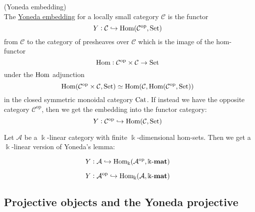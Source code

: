 \begin{definition}{(Yoneda embedding)}\label{def:yoneda_embedding}\\
The \ul{Yoneda embedding} for a locally small category $\mathcal{C}$ is the functor
\[
Y : \mathcal{C} \hookrightarrow \textup{Hom}(\mathcal{C}^{\text{op}}, \textup{Set})
\]
from $\mathcal{C}$ to the category of presheaves over $\mathcal{C}$ which is the image of the hom-functor
\[
\textup{Hom} : \mathcal{C}^{\text{op}}\times\mathcal{C} \rightarrow \textup{Set}
\]
under the $\textup{Hom}$ adjunction
\[
\textup{Hom}(\mathcal{C}^{\text{op}}\times\mathcal{C}, \textup{Set}) \simeq
\textup{Hom}(\mathcal{C},\textup{Hom}(\mathcal{C}^{\text{op}}, \textup{Set}))
\]
in the closed symmetric monoidal category $\textup{Cat}$.
If instead we have the opposite category $\mathcal{C}^{\text{op}}$, then we get the embedding into the functor category:
\[
Y : \mathcal{C}^{\text{op}} \hookrightarrow \textup{Hom}(\mathcal{C},\textup{Set})
\]
\end{definition}

\begin{remark}
Let $\mathcal{A}$ be a $\Bbbk$-linear category with finite $\Bbbk$-dimensional hom-sets. Then we get
a $\Bbbk$-linear version of Yoneda's lemma:

\[
Y : \mathcal{A} \hookrightarrow \mathrm{Hom_{\Bbbk}}(\mathcal{A^{\text{op}}},\Bbbk\textnormal{-}\mathbf{mat})
\]

\[
Y : \mathcal{A}^{\text{op}} \hookrightarrow \mathrm{Hom_{\Bbbk}}(\mathcal{A},\Bbbk\textnormal{-}\mathbf{mat})
\]

\end{remark}

\subsection{Projective objects and the Yoneda projective}

